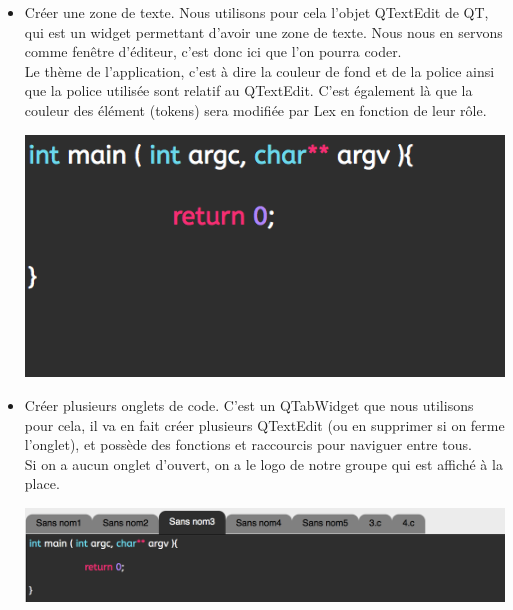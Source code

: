 \documentclass[a4paper,12pt]{article}
\begin{document}
		\begin{itemize}
		
			\item Créer une zone de texte. Nous utilisons pour cela l'objet QTextEdit de QT, qui est un widget permettant d'avoir une zone de texte. Nous nous en servons comme fenêtre d'éditeur, c'est donc ici que l'on pourra coder.\\
			Le thème de l'application, c'est à dire la couleur de fond et de la police ainsi que la police utilisée sont relatif au QTextEdit. C'est également là que la couleur des élément (tokens) sera modifiée par Lex en fonction de leur rôle.\\
			\begin{center}
				\includegraphics[scale=1]{images/QTextEdit}
				\vspace{0.5cm}
			\end{center}
			
			\item Créer plusieurs onglets de code. C'est un QTabWidget que nous utilisons pour cela, il va en fait créer plusieurs QTextEdit (ou en supprimer si on ferme l'onglet), et possède des fonctions et raccourcis pour naviguer entre tous. \\
			Si on a aucun onglet d'ouvert, on a le logo de notre groupe qui est affiché à la place.\\
			\begin{center}
				\includegraphics[scale=0.6]{images/QTabWidget}
				\vspace{0.5cm}
			\end{center}
			

\end{itemize}
\end{document}

